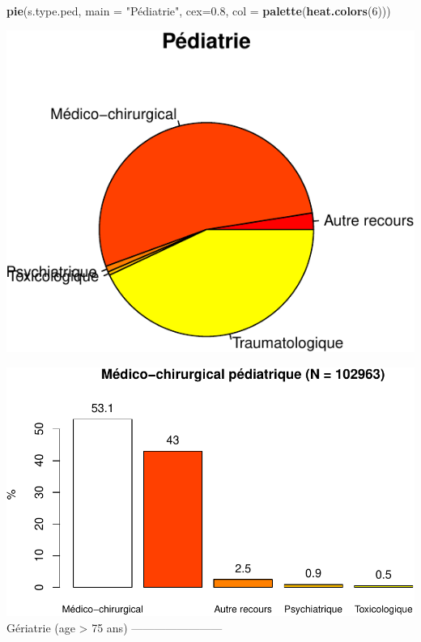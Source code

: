 \documentclass[]{article}
\newenvironment{Shaded}{\begin{snugshade}}{\end{snugshade}}
\newcommand{\KeywordTok}[1]{\textcolor[rgb]{0.13,0.29,0.53}{\textbf{{#1}}}}
\newcommand{\DataTypeTok}[1]{\textcolor[rgb]{0.13,0.29,0.53}{{#1}}}
\newcommand{\DecValTok}[1]{\textcolor[rgb]{0.00,0.00,0.81}{{#1}}}
\newcommand{\FloatTok}[1]{\textcolor[rgb]{0.00,0.00,0.81}{{#1}}}
\newcommand{\StringTok}[1]{\textcolor[rgb]{0.31,0.60,0.02}{{#1}}}
\newcommand{\OtherTok}[1]{\textcolor[rgb]{0.56,0.35,0.01}{{#1}}}
\newcommand{\NormalTok}[1]{{#1}}
\begin{document}
\begin{Shaded}
\begin{Highlighting}[]
\KeywordTok{pie}\NormalTok{(s.type.ped, }\DataTypeTok{main =} \StringTok{"Pédiatrie"}\NormalTok{, }\DataTypeTok{cex=}\FloatTok{0.8}\NormalTok{, }\DataTypeTok{col =} \KeywordTok{palette}\NormalTok{(}\KeywordTok{heat.colors}\NormalTok{(}\DecValTok{6}\NormalTok{)))}
\end{Highlighting}
\end{Shaded}

\includegraphics{analyse_merge_files/figure-latex/ped-1.pdf}\\

\begin{Shaded}
\end{Shaded}

\includegraphics{analyse_merge_files/figure-latex/ped-2.pdf}\\ Gériatrie
(age \textgreater{} 75 ans) ------------------------
\end{document}
